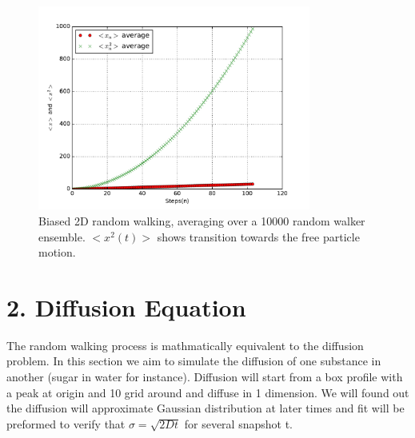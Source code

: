 \documentclass[aps,prl,preprint,superscriptaddress]{revtex4}
\begin{document}
		\begin{figure}[H]
			\centering
			\includegraphics[width=0.8\textwidth]{rwxn_2.pdf}
			\caption{Biased 2D random walking, averaging over a 10000 random walker ensemble. $<x^2(t)>$ shows transition towards the free particle motion.}
		\end{figure}
		

	
	\section{2. Diffusion Equation}
	The random walking process is mathmatically equivalent to the diffusion problem. In this section we aim to simulate the diffusion of one substance in another (sugar in water for instance). Diffusion will start from a box profile with a peak at origin and 10 grid around and diffuse in 1 dimension. We will found out the diffusion will approximate Gaussian distribution at later times and fit will be preformed to verify that $\sigma=\sqrt{2Dt}$ for several snapshot t.
\end{document}
